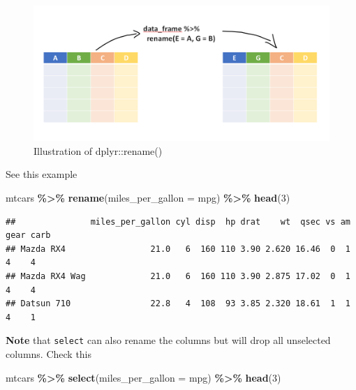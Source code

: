 \documentclass[
]{book}
\newenvironment{Shaded}{\begin{snugshade}}{\end{snugshade}}
\newcommand{\AttributeTok}[1]{\textcolor[rgb]{0.13,0.29,0.53}{#1}}
\newcommand{\DecValTok}[1]{\textcolor[rgb]{0.00,0.00,0.81}{#1}}
\newcommand{\FunctionTok}[1]{\textcolor[rgb]{0.13,0.29,0.53}{\textbf{#1}}}
\newcommand{\NormalTok}[1]{#1}
\newcommand{\SpecialCharTok}[1]{\textcolor[rgb]{0.81,0.36,0.00}{\textbf{#1}}}
\begin{document}
\begin{figure}

{\centering \includegraphics[width=0.99\linewidth]{images/rename_dplyr} 

}

\caption{Illustration of dplyr::rename()}\label{fig:renamer}
\end{figure}

See this example

\begin{Shaded}
\begin{Highlighting}[]
\NormalTok{mtcars }\SpecialCharTok{\%\textgreater{}\%} 
  \FunctionTok{rename}\NormalTok{(}\AttributeTok{miles\_per\_gallon =}\NormalTok{ mpg) }\SpecialCharTok{\%\textgreater{}\%} 
  \FunctionTok{head}\NormalTok{(}\DecValTok{3}\NormalTok{)}
\end{Highlighting}
\end{Shaded}

\begin{verbatim}
##               miles_per_gallon cyl disp  hp drat    wt  qsec vs am gear carb
## Mazda RX4                 21.0   6  160 110 3.90 2.620 16.46  0  1    4    4
## Mazda RX4 Wag             21.0   6  160 110 3.90 2.875 17.02  0  1    4    4
## Datsun 710                22.8   4  108  93 3.85 2.320 18.61  1  1    4    1
\end{verbatim}

\textbf{Note} that \texttt{select} can also rename the columns but will drop all unselected columns. Check this

\begin{Shaded}
\begin{Highlighting}[]
\NormalTok{mtcars }\SpecialCharTok{\%\textgreater{}\%} 
  \FunctionTok{select}\NormalTok{(}\AttributeTok{miles\_per\_gallon =}\NormalTok{ mpg) }\SpecialCharTok{\%\textgreater{}\%} 
  \FunctionTok{head}\NormalTok{(}\DecValTok{3}\NormalTok{)}
\end{Highlighting}
\end{Shaded}
\end{document}
